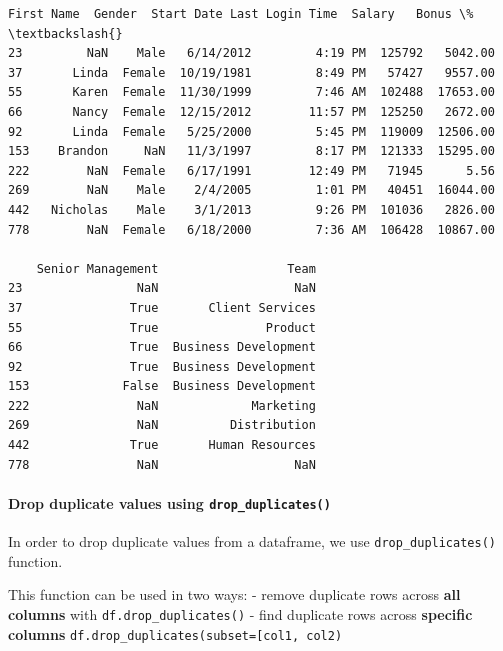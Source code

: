 \documentclass [oneside,10pt,a4paper,ngerman,BCOR10mm,headsepline,parindent,final]{scrartcl}
\makeatletter
\newcommand{\boxspacing}{\kern\kvtcb@left@rule\kern\kvtcb@boxsep}
\newcommand{\prompt}[4]{
        {\ttfamily\llap{{\color{#2}[#3]:\hspace{3pt}#4}}\vspace{-\baselineskip}}
    }
\makeatother
\begin{document}
            \begin{tcolorbox}[breakable, size=fbox, boxrule=.5pt, pad at break*=1mm, opacityfill=0]
\prompt{Out}{outcolor}{16}{\boxspacing}
\begin{Verbatim}[commandchars=\\\{\}]
    First Name  Gender  Start Date Last Login Time  Salary   Bonus \%  \textbackslash{}
23         NaN    Male   6/14/2012         4:19 PM  125792   5042.00
37       Linda  Female  10/19/1981         8:49 PM   57427   9557.00
55       Karen  Female  11/30/1999         7:46 AM  102488  17653.00
66       Nancy  Female  12/15/2012        11:57 PM  125250   2672.00
92       Linda  Female   5/25/2000         5:45 PM  119009  12506.00
153    Brandon     NaN   11/3/1997         8:17 PM  121333  15295.00
222        NaN  Female   6/17/1991        12:49 PM   71945      5.56
269        NaN    Male    2/4/2005         1:01 PM   40451  16044.00
442   Nicholas    Male    3/1/2013         9:26 PM  101036   2826.00
778        NaN  Female   6/18/2000         7:36 AM  106428  10867.00

    Senior Management                  Team
23                NaN                   NaN
37               True       Client Services
55               True               Product
66               True  Business Development
92               True  Business Development
153             False  Business Development
222               NaN             Marketing
269               NaN          Distribution
442              True       Human Resources
778               NaN                   NaN
\end{Verbatim}
\end{tcolorbox}
        
    \hypertarget{drop-duplicate-values-using-drop_duplicates}{%
\paragraph{\texorpdfstring{Drop duplicate values using
\texttt{drop\_duplicates()}}{Drop duplicate values using drop\_duplicates()}}\label{drop-duplicate-values-using-drop_duplicates}}

In order to drop duplicate values from a dataframe, we use
\texttt{drop\_duplicates()} function.

This function can be used in two ways: - remove duplicate rows across
\textbf{all columns} with \texttt{df.drop\_duplicates()} - find
duplicate rows across \textbf{specific columns}
\texttt{df.drop\_duplicates(subset={[}\textquotesingle{}col1\textquotesingle{},\ \textquotesingle{}col2\textquotesingle{}{]})}
\end{document}
